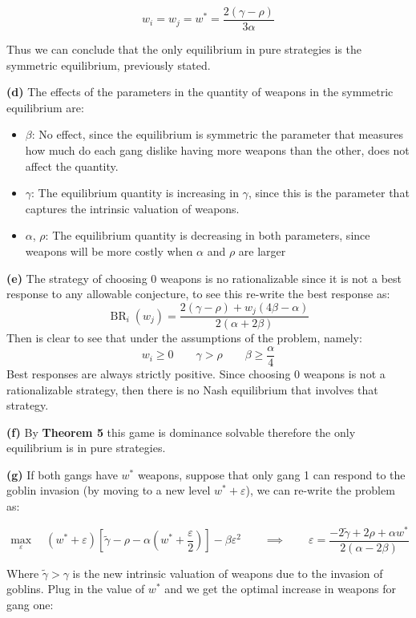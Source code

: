 \documentclass{article}
\theoremstyle{definition}
\newcommand{\qiq}{\qquad \implies \qquad}
\begin{document}
$$w_i = w_j = w^* = \frac{2(\gamma - \rho)}{3\alpha}$$

Thus we can conclude that the only equilibrium in pure strategies is the symmetric equilibrium, previously stated.

\textbf{(d)}
The effects of the parameters in the quantity of weapons in the symmetric equilibrium are:
\begin{itemize}
    \item $\beta$: No effect, since the equilibrium is symmetric the parameter that measures how much do each gang dislike having more weapons than the other, does not affect the quantity.
    \item $\gamma$: The equilibrium quantity is increasing in $\gamma$, since this is the parameter that captures the intrinsic valuation of weapons.
    \item $\alpha$, $\rho$: The equilibrium quantity is decreasing in both parameters, since weapons will be more costly when  $\alpha$ and $\rho$ are larger
\end{itemize}

\textbf{(e)}
The strategy of choosing $0$ weapons is no rationalizable since it is not a best response to any allowable conjecture, to see this re-write the best response as:
$$\operatorname{BR}_i(w_j) =  \frac{2(\gamma - \rho)+w_j(4\beta - \alpha)}{2 (\alpha +2 \beta )}$$
Then is clear to see that under the assumptions of the problem, namely:
$$w_i \geq 0 \qquad  \gamma > \rho \qquad \beta \geq \frac{\alpha}{4}$$
Best responses are always strictly positive. Since choosing $0$ weapons is not a rationalizable strategy, then there is no Nash equilibrium that involves that strategy. 

\textbf{(f)} By \cite{milgrom1990rationalizability} \textbf{Theorem 5} this game is dominance solvable therefore the only equilibrium is in pure strategies.

\textbf{(g)}
If both gangs have $w^*$ weapons, suppose that only gang 1 can respond to the goblin invasion (by moving to a new level $w^*
+\varepsilon$), we can re-write the problem as:

$$\max_{\varepsilon} \quad (w^*+\varepsilon)\left[\tilde{\gamma}-\rho-\alpha\left(w^*+\frac{\varepsilon}{2}\right)\right]-\beta \varepsilon^2 \qiq \varepsilon = \frac{-2 \tilde{\gamma} +2 \rho +\alpha  w^*}{2 (\alpha -2 \beta )}$$

Where $\tilde{\gamma} > \gamma $ is the new intrinsic valuation of weapons due to the invasion of goblins. Plug in the value of $w^*$ and we get the optimal increase in weapons for gang one:
\end{document}
